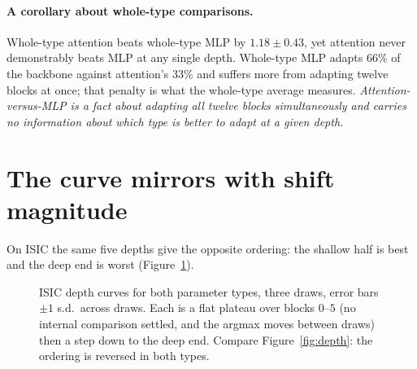 \documentclass[11pt]{article}
\newcommand{\dd}[2]{$#1 \pm #2$}
\begin{document}
\paragraph{A corollary about whole-type comparisons.} Whole-type attention beats
whole-type MLP by \dd{1.18}{0.43}, yet attention never demonstrably beats MLP at any
single depth. Whole-type MLP adapts $66\%$ of the backbone against attention's $33\%$
and suffers more from adapting twelve blocks at once; that penalty is what the
whole-type average measures. \emph{Attention-versus-MLP is a fact about adapting all
twelve blocks simultaneously and carries no information about which type is better to
adapt at a given depth.}

\section{The curve mirrors with shift magnitude}
\label{sec:mirror}

On ISIC the same five depths give the opposite ordering: the shallow half is best and
the deep end is worst (Figure~\ref{fig:mirror}).

\begin{figure}[t]
\centering
{}
\caption{ISIC depth curves for both parameter types, three draws, error bars
$\pm 1$ s.d.\ across draws. Each is a flat plateau over blocks $0$--$5$ (no internal
comparison settled, and the argmax moves between draws) then a step down to the deep
end. Compare Figure~\ref{fig:depth}: the ordering is reversed in both types.}
\label{fig:mirror}
\end{figure}
\end{document}

